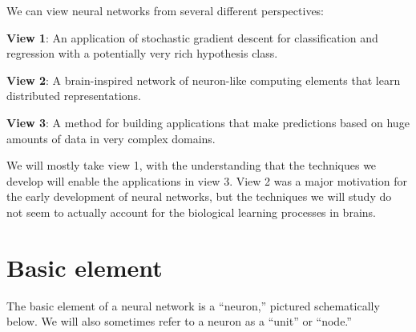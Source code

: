 We can view neural networks from several different perspectives:
\begin{description}
  \item{\bf View 1}: An application of stochastic gradient descent for
        classification and regression with a potentially very rich
        hypothesis class.
  \item{\bf View 2}: A brain-inspired network of neuron-like computing
        elements that learn distributed representations.
  \item{\bf View 3}: A method for building applications that make
        predictions based on huge amounts of data in very complex domains.
\end{description}

We will mostly take view 1, with the understanding that the techniques
we develop will enable the applications in view 3.  View 2 was a major
motivation for the early development of neural networks, but the
techniques we will study do not  seem to actually account for the biological learning
processes in brains.

\section{Basic element}
The basic element of a neural network is a ``neuron,'' pictured
schematically below.  We will also sometimes refer to a
neuron as a ``unit'' or ``node.'' 
\begin{center}
\end{center}

